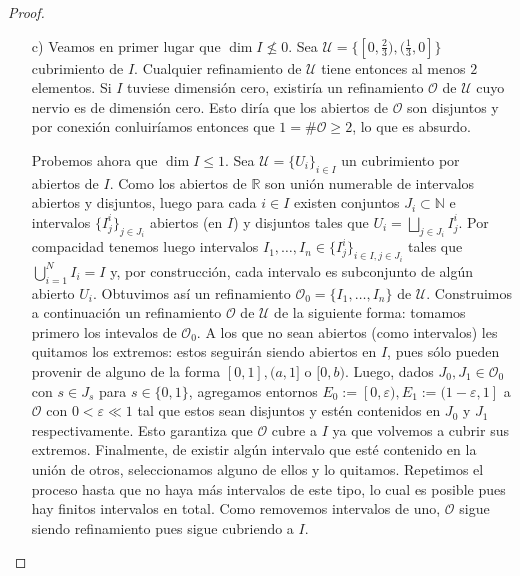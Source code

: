 \documentclass[12pt]{article}
\newcommand{\N}{\mathbb{N}}
\newcommand{\R}{\mathbb{R}}
\newcommand{\eps}{\varepsilon}
\begin{document}
\begin{proof}
\begin{itemize}
\item[c)] Veamos en primer lugar que $\dim I \not \leq 0$. Sea $\mathcal{U} = \{[0,\frac{2}{3}), (\frac{1}{3},0]\}$ cubrimiento de $I$. Cualquier refinamiento de $\mathcal{U}$ tiene entonces al menos $2$ elementos. Si $I$ tuviese dimensi\'on cero, existir\'ia un refinamiento $\mathcal{O}$ de $\mathcal{U}$ cuyo nervio es de dimensi\'on cero. Esto dir\'ia que los abiertos de $\mathcal{O}$ son disjuntos y por conexi\'on conluir\'iamos entonces que $1 = \#\mathcal{O} \geq 2$, lo que es absurdo. 

Probemos ahora que $\dim I \leq 1$. Sea $\mathcal{U} = \{U_i\}_{i \in I}$ un cubrimiento por abiertos de $I$. Como los abiertos de $\R$ son uni\'on numerable de intervalos abiertos y disjuntos, luego para cada $i \in I$ existen conjuntos $J_i \subset \N$ e intervalos $\{I^i_j\}_{j \in J_i}$ abiertos (en $I$) y disjuntos tales que $U_i = \bigsqcup_{j \in J_i}I_j^i$. Por compacidad tenemos luego intervalos $I_1, \dots, I_n \in \{I_j^i\}_{i \in I, j \in J_i}$ tales que $\bigcup_{i=1}^N I_i = I$ y, por construcci\'on, cada intervalo es subconjunto de alg\'un abierto $U_i$. Obtuvimos as\'i un refinamiento $\mathcal{O}_0 = \{I_1, \dots, I_n\}$ de $\mathcal{U}$. Construimos a continuaci\'on un refinamiento $\mathcal{O}$ de $\mathcal{U}$ de la siguiente forma: tomamos primero los intevalos de $\mathcal{O}_0$. A los que no sean abiertos (como intervalos) les quitamos los extremos: estos seguir\'an siendo abiertos en $I$, pues s\'olo pueden provenir de alguno de la forma $[0,1], (a,1]$ o $[0,b)$. Luego, dados $J_0,J_1 \in \mathcal{O}_0$ con $s \in J_s$ para $s \in \{0,1\}$, agregamos entornos $E_0 := [0,\eps), E_1 := (1-\eps,1]$ a $\mathcal{O}$ con $0 < \eps \ll 1$ tal que estos sean disjuntos y est\'en contenidos en $J_0$ y $J_1$ respectivamente. Esto garantiza que $\mathcal{O}$ cubre a $I$ ya que volvemos a cubrir sus extremos. Finalmente, de existir alg\'un intervalo que est\'e contenido en la uni\'on de otros, seleccionamos alguno de ellos y lo quitamos. Repetimos el proceso hasta que no haya m\'as intervalos de este tipo, lo cual es posible pues hay finitos intervalos en total. Como removemos intervalos de uno, $\mathcal{O}$ sigue siendo refinamiento pues sigue cubriendo a $I$. 


\end{itemize}
\end{proof}
\end{document}
